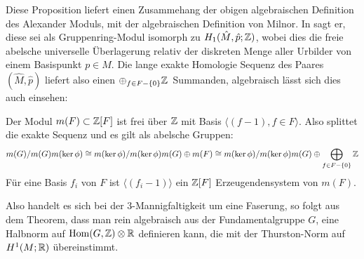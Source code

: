 	Diese Proposition liefert einen Zusammehang der obigen algebraischen Definition des Alexander Moduls, mit der algebraischen Definition von Milnor. In \cite{McMullen2002} sagt er, diese sei als Gruppenring-Modul isomorph zu $H_1(\hat M,\hat p;\mathbb{Z})$, wobei dies die freie abelsche universelle Überlagerung relativ der diskreten Menge aller Urbilder von einem Basispunkt $p \in M$. Die lange exakte Homologie Sequenz des Paares $(\hat M,\hat p)$ liefert also einen $\oplus_{f \in F - \{0\}}\mathbb{Z}$~Summanden, algebraisch lässt sich dies auch einsehen:
	\begin{prop}
	 	Der Modul $m(F)\subset \mathbb{Z}[F]$ ist frei über $\mathbb{Z}$ mit Basis $\langle (f-1),f\in F \rangle$. Also splittet die exakte Sequenz und es gilt als abelsche Gruppen:
	 	\[
	 		m(G)/m(G)m(\ker\phi) \cong m(\ker\phi)/m(\ker\phi)m(G) \oplus m(F) \cong  m(\ker\phi)/m(\ker\phi)m(G) \oplus \bigoplus_{f\in F-\{0\}} \mathbb{Z}
	 	\]
	 	 Für eine Basis $f_i$ von $F$ ist $\langle(f_i-1)\rangle$ ein $\mathbb{Z}[F]$ Erzeugendensystem von $m(F)$.
	 \end{prop} 


	 Also handelt es sich bei der 3-Mannigfaltigkeit um eine Faserung, so folgt aus dem Theorem, dass man rein algebraisch aus der Fundamentalgruppe $G$, eine Halbnorm auf $\operatorname{Hom}(G,\mathbb{Z})\otimes \mathbb{R}$ definieren kann, die mit der Thurston-Norm auf $H^1(M;\mathbb{R})$ übereinstimmt.
